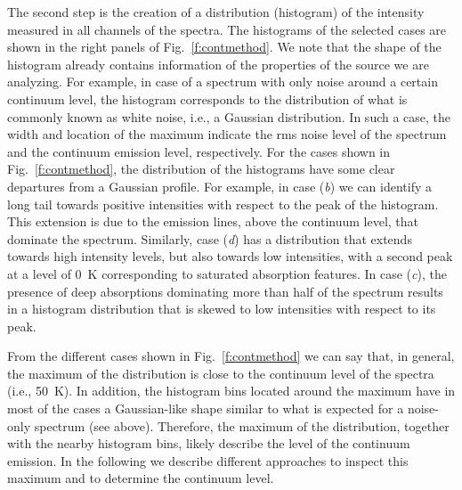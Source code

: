 \documentclass{aa}
\begin{document}
The second step is the creation of a distribution (histogram) of the intensity measured in all channels of the spectra. The histograms of the selected cases are shown in the right panels of Fig.~\ref{f:contmethod}. We note that the shape of the histogram already contains information of the properties of the source we are analyzing. For example, in case of a spectrum with only noise around a certain continuum level, the histogram corresponds to the distribution of what is commonly known as white noise, i.e., a Gaussian distribution. In such a case, the width and location of the maximum indicate the rms noise level of the spectrum and the continuum emission level, respectively. For the cases shown in Fig.~\ref{f:contmethod}, the distribution of the histograms have some clear departures from a Gaussian profile. For example, in case (\textit{b}) we can identify a long tail towards positive intensities with respect to the peak of the histogram. This extension is due to the emission lines, above the continuum level, that dominate the spectrum. Similarly, case (\textit{d}) has a distribution that extends towards high intensity levels, but also towards low intensities, with a second peak at a level of 0~K corresponding to saturated absorption features. In case (\textit{c}), the presence of deep absorptions dominating more than half of the spectrum results in a histogram distribution that is skewed to low intensities with respect to its peak.

From the different cases shown in Fig.~\ref{f:contmethod} we can say that, in general, the maximum of the distribution is close to the continuum level of the spectra (i.e., 50~K). In addition, the histogram bins located around the maximum have in most of the cases a Gaussian-like shape similar to what is expected for a noise-only spectrum (see above). Therefore, the maximum of the distribution, together with the nearby histogram bins, likely describe the level of the continuum emission. In the following we describe different approaches to inspect this maximum and to determine the continuum level.
\end{document}

